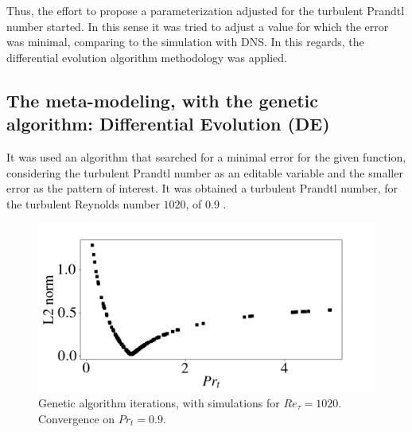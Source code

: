\documentclass[10pt]{article} %
\begin{document}
Thus, the effort to propose a parameterization adjusted for the turbulent Prandtl number started.
In this sense it was tried to adjust a value for which the error was minimal, comparing to the simulation with DNS. In this regards, the differential evolution algorithm methodology was applied. 



\subsection{The meta-modeling, with the genetic algorithm: Differential Evolution (DE)}
It was used an algorithm that searched for a minimal error for the given function, considering the turbulent Prandtl number as an editable variable and the smaller error as the pattern of interest.
It was obtained a turbulent Prandtl number, for the turbulent Reynolds number $ 1020$, of $ 0.9 $ .
\begin{figure}[!h]
	\centering
	\includegraphics[angle=0, scale=0.31]{fotos_formatacao_final/Genetic_amostra}
	\caption{Genetic algorithm iterations, with simulations for $Re_\tau = 1020$. Convergence on $Pr_t = 0.9 $.}
\end{figure}
\end{document}

